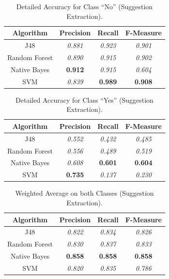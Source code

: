\begin{table}[H]
\centering
\caption{Detailed Accuracy for Class “No” (Suggestion Extraction).}
\label{45_table_ref}
\begin{tabular}{cccc}
\hline
{\bf Algorithm} & {\bf Precision} & {\bf Recall} & {\bf F-Measure} \\ \hline
J48             & {\it 0.881}     & {\it 0.923}  & {\it 0.901}     \\
Random Forest   & {\it 0.890}      & {\it 0.915}  & {\it 0.902}     \\
Native Bayes    & {\bf 0.912}     & {\it 0.915}  & {\it 0.604}     \\
SVM             & {\it 0.839}     & {\bf 0.989}  & {\bf 0.908}     \\ \hline
\end{tabular}
\end{table}

\begin{table}[H]
\centering
\caption{Detailed Accuracy for Class “Yes” (Suggestion Extraction).}
\label{46_table_ref}
\begin{tabular}{cccc}
\hline
{\bf Algorithm} & {\bf Precision} & {\bf Recall} & {\bf F-Measure} \\ \hline
J48             & {\it 0.552}     & {\it 0.432}  & {\it 0.485}     \\
Random Forest   & {\it 0.556}     & {\it 0.489}  & {\it 0.519}     \\
Native Bayes    & {\it 0.608}     & {\bf 0.601}  & {\bf 0.604}     \\
SVM             & {\bf 0.735}     & {\it 0.137}  & {\it 0.230}     \\ \hline
\end{tabular}
\end{table}

\begin{table}[H]
\centering
\caption{Weighted Average on both Classes (Suggestion Extraction).}
\label{47_table_ref}
\begin{tabular}{cccc}
\hline
{\bf Algorithm} & {\bf Precision} & {\bf Recall} & {\bf F-Measure} \\ \hline
J48             & {\it 0.822}     & {\it 0.834}  & {\it 0.826}     \\
Random Forest   & {\it 0.830}      & {\it 0.837}  & {\it 0.833}     \\
Native Bayes    & {\bf 0.858}     & {\bf 0.858}  & {\bf 0.858}     \\
SVM             & {\it 0.820}      & {\it 0.835}  & {\it 0.786}     \\ \hline
\end{tabular}
\end{table}

